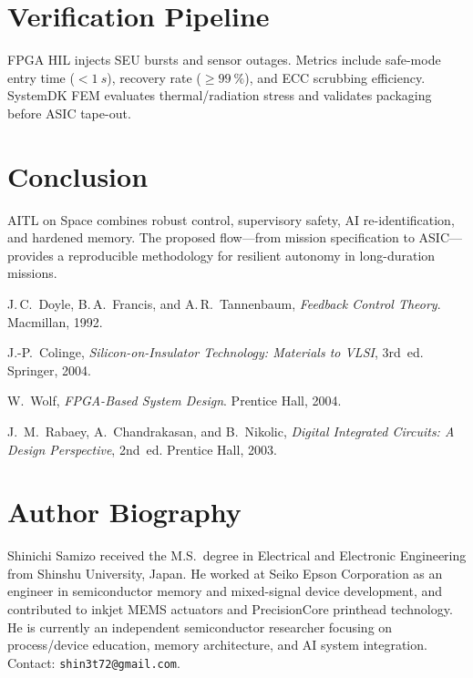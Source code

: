 \documentclass[conference]{IEEEtran}
\begin{document}
\section{Verification Pipeline}
FPGA HIL injects SEU bursts and sensor outages. Metrics include safe-mode entry time ($<\SI{1}{s}$), recovery rate ($\ge\SI{99}{\percent}$), and ECC scrubbing efficiency. SystemDK FEM evaluates thermal/radiation stress and validates packaging before ASIC tape-out.

\section{Conclusion}
AITL on Space combines robust control, supervisory safety, AI re-identification, and hardened memory. The proposed flow---from mission specification to ASIC---provides a reproducible methodology for resilient autonomy in long-duration missions.

\begin{thebibliography}{99}
J.\,C.~Doyle, B.\,A.~Francis, and A.\,R.~Tannenbaum,
\emph{Feedback Control Theory}. Macmillan, 1992.

J.-P.~Colinge, \emph{Silicon-on-Insulator Technology: Materials to VLSI}, 3rd~ed. Springer, 2004.

W.~Wolf, \emph{FPGA-Based System Design}. Prentice Hall, 2004.

J.~M.~Rabaey, A.~Chandrakasan, and B.~Nikolic,
\emph{Digital Integrated Circuits: A Design Perspective}, 2nd~ed. Prentice Hall, 2003.
\end{thebibliography}

\section*{Author Biography}
Shinichi Samizo received the M.S.\ degree in Electrical and Electronic Engineering from Shinshu University, Japan. He worked at Seiko Epson Corporation as an engineer in semiconductor memory and mixed-signal device development, and contributed to inkjet MEMS actuators and PrecisionCore printhead technology. He is currently an independent semiconductor researcher focusing on process/device education, memory architecture, and AI system integration. Contact: \texttt{shin3t72@gmail.com}.
\end{document}
